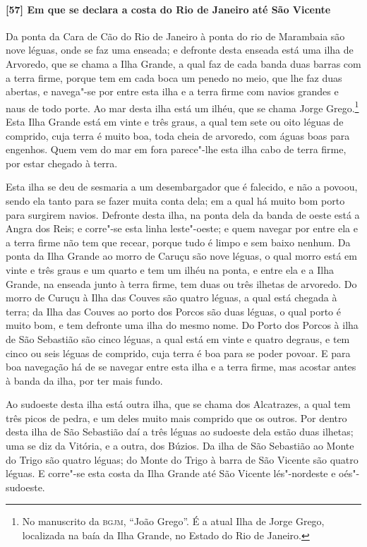 \begin{linenumbers}
\paragraph{[57] Em que se declara a costa do Rio de Janeiro até São Vicente} \quad
Da ponta da Cara de Cão do Rio de Janeiro à ponta do rio de Marambaia são nove léguas,
onde se faz uma enseada; e defronte desta enseada está uma ilha de Arvoredo, que se chama
a Ilha Grande, a qual faz de cada banda duas barras com a terra firme, porque tem em cada
boca um penedo no meio, que lhe faz duas abertas, e navega"-se por entre esta ilha e a
terra firme com navios grandes e naus de todo porte. Ao mar desta ilha está um ilhéu, que
se chama Jorge Grego.\footnote{ No manuscrito da \textsc{bgjm}, ``João Grego''. É a atual
Ilha de Jorge Grego, localizada na baía da Ilha Grande, no Estado do Rio de Janeiro.}
Esta Ilha Grande está em vinte e três graus, a qual tem sete ou oito léguas de comprido,
cuja terra é muito boa, toda cheia de arvoredo, com águas boas para engenhos. Quem vem do
mar em fora parece"-lhe esta ilha cabo de terra firme, por estar chegado à terra.

Esta ilha se deu de sesmaria a um desembargador que é falecido, e não a povoou, sendo ela
tanto para se fazer muita conta dela; em a qual há muito bom porto para surgirem navios.
Defronte desta ilha, na ponta dela da banda de oeste está a Angra dos Reis; e corre"-se
esta linha leste"-oeste; e quem navegar por entre ela e a terra firme não tem que recear,
porque tudo é limpo e sem baixo nenhum. Da ponta da Ilha Grande ao morro de Caruçu são
nove léguas, o qual morro está em vinte e três graus e um quarto e tem um ilhéu na ponta,
e entre ela e a Ilha Grande, na enseada junto à terra firme, tem duas ou três ilhetas de
arvoredo. Do morro de Curuçu à Ilha das Couves são quatro léguas, a qual está chegada à
terra; da Ilha das Couves ao porto dos Porcos são duas léguas, o qual porto é muito bom, e
tem defronte uma ilha do mesmo nome. Do Porto dos Porcos à ilha de São Sebastião são cinco
léguas, a qual está em vinte e quatro degraus, e tem cinco ou seis léguas de comprido,
cuja terra é boa para se poder povoar. E para boa navegação há de se navegar entre esta
ilha e a terra firme, mas acostar antes à banda da ilha, por ter mais fundo.

Ao sudoeste desta ilha está outra ilha, que se chama dos Alcatrazes, a qual tem três picos
de pedra, e um deles muito mais comprido que os outros. Por dentro desta ilha de São
Sebastião daí a três léguas ao sudoeste dela estão duas ilhetas; uma se diz da Vitória, e
a outra, dos Búzios. Da ilha de São Sebastião ao Monte do Trigo são quatro léguas; do
Monte do Trigo à barra de São Vicente são quatro léguas. E corre"-se esta costa da Ilha
Grande até São Vicente lés"-nordeste e oés"-sudoeste.


\end{linenumbers}
